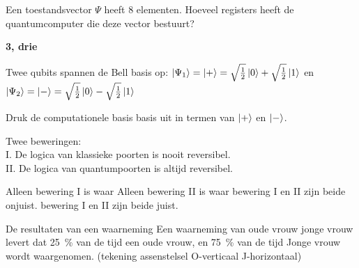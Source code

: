 \documentclass[a4paper, addpoints, 12pt
    , answers    %
    ]{exam}
\begin{document}
\begin{questions}
\question[1]
Een toestandsvector $\Psi$ heeft 8 elementen. Hoeveel registers heeft de quantumcomputer die deze vector bestuurt?

\ifprintanswers
\textbf{3, drie}
\else
\fillwithlines{.5in}
\fi


\question[1]
Twee qubits spannen de Bell basis op: $\ket{\Psi_1} = \ket{+}= \sqrt{\tfrac{1}{2}}\ket{0}+ \sqrt{\tfrac{1}{2}}\ket{1}$ en 
$\ket{\Psi_2}= \ket{-} = \sqrt{\tfrac{1}{2}}\ket{0}- \sqrt{\tfrac{1}{2}}\ket{1}$

Druk de computationele basis basis uit in termen van $\ket{+}$ en $\ket{-}$.

\question[1] Twee beweringen:\\
I. De logica van klassieke poorten is nooit reversibel.\\
II. De logica van quantumpoorten is altijd reversibel.

\begin{choices}
\choice Alleen bewering I is waar
\correctchoice Alleen bewering II is waar
\choice bewering I en II zijn beide onjuist.
\choice bewering I en II zijn beide juist.
\end{choices}



De resultaten van een waarneming
Een waarneming van oude vrouw jonge vrouw levert dat \SI{25}{\percent} van de tijd een oude vrouw, en \SI{75}{\percent} van de tijd Jonge vrouw wordt waargenomen.
(tekening assenstelsel O-verticaal J-horizontaal)

\end{questions}
\end{document}
